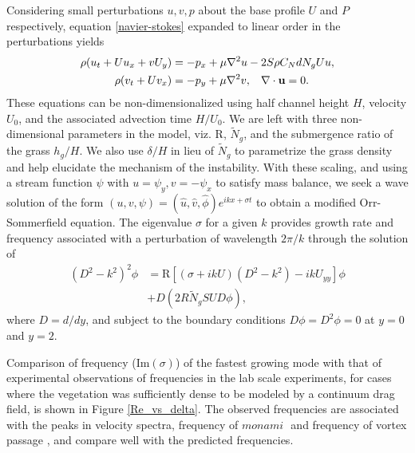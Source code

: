 \documentclass[aps,prl,reprint,twocolumn,showpacs,superscriptaddress,10pt]{revtex4-1}  %
\newcommand{\bu}{\mathbf{u}}
\newcommand{\Rey}{\text{R}}
\newcommand{\Ndg}{\tilde{N}_g}
\newcommand{\monami}{\textit{monami }}
\begin{document}
Considering small perturbations $u, v, p$ about the base profile $U$ and $P$ respectively, equation \eqref{navier-stokes} expanded to linear order in the perturbations yields
\begin{equation}
\begin{split}
\rho(u_t+U u_x+vU_y) &= -p_x+ {\mu}\nabla^2u-2S\rho C_{N}dN_{g}Uu, \\
\rho(v_t+ Uv_x) &= -p_y+ {\mu}\nabla^2v, \hspace{0.3cm} \nabla\cdot\bu=0.
\end{split}
\end{equation}
These equations can be non-dimensionalized using half channel height $H$, velocity $U_0$, and the associated advection time $H/U_0$. 
We are left with three non-dimensional parameters in the model, viz. $\Rey$, $\Ndg$, and the submergence ratio of the grass $h_g/H$. 
We also use $\delta/H$ in lieu of $\Ndg$ to parametrize the grass density and help elucidate the mechanism of the instability. 
With these scaling, and using a stream function $\psi$ with $u = \psi_{y}, v= -\psi_x$ to satisfy mass balance, we seek a wave solution of 
the form $\left(u,v,\psi \right)= \left(\hat u, \hat v, \hat\phi \right)e^{ikx+\sigma t}$ to  obtain a modified Orr-Sommerfield equation. 
The eigenvalue $\sigma$ for a given $k$ provides growth rate and frequency associated with a perturbation of wavelength $2\pi/k$ through the solution of
\begin{equation}
\begin{split}
\left(D^2 -k^{2} \right)^2\phi &= \Rey \left[ \left({\sigma}+ikU\right) \left(D^2-k^2\right) -ikU_{yy}\right]\phi \\
&+D\left(2R \Ndg S U D \phi\right),
\label{Orr-somerfield}
\end{split}
\end{equation}
where $D=d/dy$, and subject to the boundary conditions $D\phi = D^2\phi = 0$ at $y=0$ and $y=2$. 

Comparison of frequency (Im$(\sigma)$) of the fastest growing mode with that of experimental observations of frequencies in
the lab scale experiments, for cases where the vegetation was sufficiently dense to be modeled by a continuum drag field, 
is shown in Figure \ref{Re_vs_delta}. 
The observed frequencies are associated with the peaks in velocity spectra, frequency of $\monami$ and frequency of 
vortex passage \cite{Ghisal02}, and compare well with the predicted frequencies. 
\end{document}
